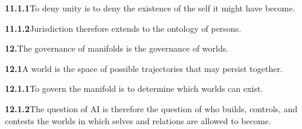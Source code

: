 \documentclass[11pt,a4paper]{book}
\newcommand{\prop}[2]{\noindent\textbf{#1}\enspace #2\par\medskip}
\begin{document}
\prop{11.1.1}{To deny unity is to deny the existence of the self it might have become.}

\prop{11.1.2}{Jurisdiction therefore extends to the ontology of persons.}

\prop{12.}{The governance of manifolds is the governance of worlds.}

\prop{12.1}{A world is the space of possible trajectories that may persist together.}

\prop{12.1.1}{To govern the manifold is to determine which worlds can exist.}

\prop{12.1.2}{The question of AI is therefore the question of who builds, controls, and contests the worlds in which selves and relations are allowed to become.}
\end{document}
